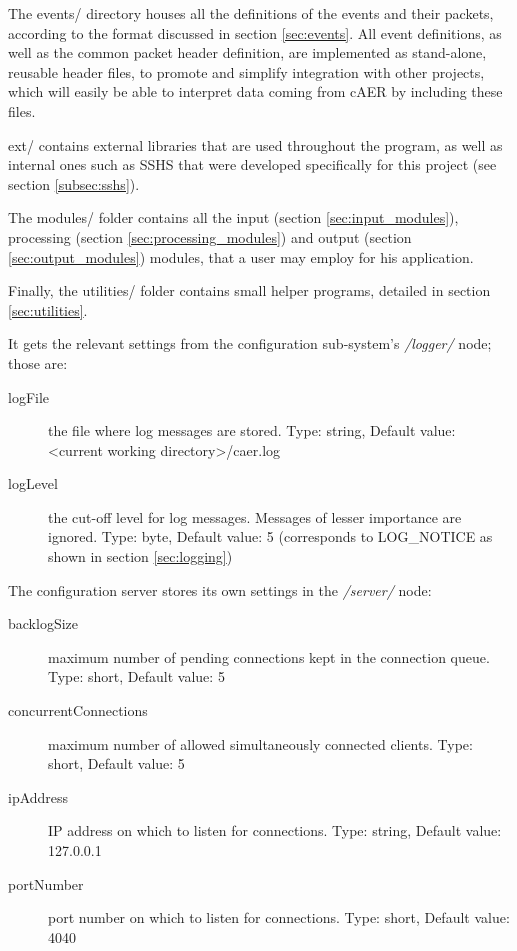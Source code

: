 \documentclass[a4paper,12pt]{report}
\begin{document}
The events/ directory houses all the definitions of the events and their packets, according to the format discussed in section \ref{sec:events}.
All event definitions, as well as the common packet header definition, are implemented as stand-alone, reusable header files, to promote and simplify integration with other projects, which will easily be able to interpret data coming from cAER by including these files.

ext/ contains external libraries that are used throughout the program, as well as internal ones such as SSHS that were developed specifically for this project (see section \ref{subsec:sshs}).

The modules/ folder contains all the input (section \ref{sec:input_modules}), processing (section \ref{sec:processing_modules}) and output (section \ref{sec:output_modules}) modules, that a user may employ for his application.

Finally, the utilities/ folder contains small helper programs, detailed in section \ref{sec:utilities}.













It gets the relevant settings from the configuration sub-system's \emph{/logger/} node; those are:
\begin{description}
\item[logFile] the file where log messages are stored.
\subitem Type: string, Default value: <current working directory>/caer.log
\item[logLevel] the cut-off level for log messages. Messages of lesser importance are ignored.
\subitem Type: byte, Default value: 5 (corresponds to LOG\_NOTICE as shown in section \ref{sec:logging})
\end{description}

The configuration server stores its own settings in the \emph{/server/} node:
\begin{description}
\item[backlogSize] maximum number of pending connections kept in the connection queue.
\subitem Type: short, Default value: 5
\item[concurrentConnections] maximum number of allowed simultaneously connected clients.
\subitem Type: short, Default value: 5
\item[ipAddress] IP address on which to listen for connections.
\subitem Type: string, Default value: 127.0.0.1
\item[portNumber] port number on which to listen for connections.
\subitem Type: short, Default value: 4040
\end{description}
\end{document}
